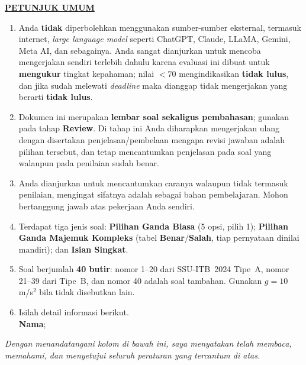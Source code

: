 \documentclass[11pt]{article}
\begin{document}
\noindent\textbf{\underline{PETUNJUK UMUM}}
\begin{enumerate}[leftmargin=*,itemsep=4pt,topsep=4pt]
  \item Anda \textbf{tidak} diperbolehkan menggunakan sumber-sumber eksternal,
        termasuk internet, \textit{large language model} seperti ChatGPT, Claude,
        LLaMA, Gemini, Meta AI, dan sebagainya. Anda sangat dianjurkan untuk
        mencoba mengerjakan sendiri terlebih dahulu karena evaluasi ini dibuat
        untuk \textbf{mengukur} tingkat kepahaman; nilai $<70$ mengindikasikan
        \textbf{tidak lulus}, dan jika sudah melewati \textit{deadline} maka
        dianggap tidak mengerjakan yang berarti \textbf{tidak lulus}.

  \item Dokumen ini merupakan \textbf{lembar soal sekaligus pembahasan}; gunakan
        pada tahap \textbf{Review}. Di tahap ini Anda diharapkan mengerjakan ulang
        dengan disertakan penjelasan/pembelaan mengapa revisi jawaban adalah pilihan
        tersebut, dan tetap mencantumkan penjelasan pada soal yang walaupun pada
        penilaian sudah benar.

  \item Anda dianjurkan untuk mencantumkan caranya walaupun tidak termasuk
        penilaian, mengingat sifatnya adalah sebagai bahan pembelajaran.
        Mohon bertanggung jawab atas pekerjaan Anda sendiri.

  \item Terdapat tiga jenis soal: \textbf{Pilihan Ganda Biasa} (5 opsi, pilih 1);
        \textbf{Pilihan Ganda Majemuk Kompleks} (tabel \textbf{Benar}/\textbf{Salah},
        tiap pernyataan dinilai mandiri); dan \textbf{Isian Singkat}.

  \item Soal berjumlah \textbf{40 butir}: nomor 1--20 dari SSU-ITB~2024 Tipe~A,
        nomor 21--39 dari Tipe~B, dan nomor 40 adalah soal tambahan.
        Gunakan $g=10$ m/s$^2$ bila tidak disebutkan lain.

  \item Isilah detail informasi berikut.\\[0.3em]
        \textbf{Nama}\hspace{0.45cm};\enspace\underline{\hspace{8cm}}
\end{enumerate}

\vspace{0.6cm}
\noindent\textit{Dengan menandatangani kolom di bawah ini, saya menyatakan telah membaca,
memahami, dan menyetujui seluruh peraturan yang tercantum di atas.}
\end{document}
